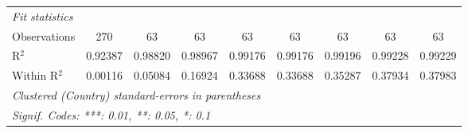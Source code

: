 \begin{table}[htbp]
\begin{tabular}{lcccccccc}
      \midrule
      \emph{Fit statistics}\\
      Observations                                                          & 270      & 63       & 63             & 63              & 63                    & 63              & 63                   & 63\\  
      R$^2$                                                                 & 0.92387  & 0.98820  & 0.98967        & 0.99176         & 0.99176               & 0.99196         & 0.99228              & 0.99229\\  
      Within R$^2$                                                          & 0.00116  & 0.05084  & 0.16924        & 0.33688         & 0.33688               & 0.35287         & 0.37934              & 0.37983\\  
      \midrule \midrule
      \multicolumn{9}{l}{\emph{Clustered (Country) standard-errors in parentheses}}\\
      \multicolumn{9}{l}{\emph{Signif. Codes: ***: 0.01, **: 0.05, *: 0.1}}\\
   \end{tabular}
\end{table}


